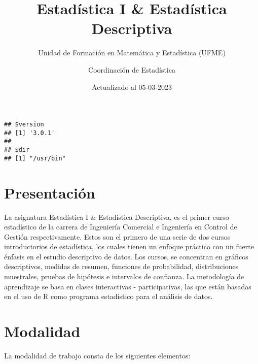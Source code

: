 \documentclass[
]{book}
\title{Estadística I \& Estadística Descriptiva}
\subtitle{Unidad de Formación en Matemática y Estadística (UFME)}
\author{Coordinación de Estadística}
\date{Actualizado al 05-03-2023}
\theoremstyle{definition}
\theoremstyle{definition}
\theoremstyle{definition}
\theoremstyle{definition}
\theoremstyle{remark}
\begin{document}
\maketitle

{
\setcounter{tocdepth}{1}
\tableofcontents
}
\begin{verbatim}
## $version
## [1] '3.0.1'
## 
## $dir
## [1] "/usr/bin"
\end{verbatim}

\hypertarget{presentaciuxf3n}{%
\chapter*{Presentación}\label{presentaciuxf3n}}

La asignatura Estadística I \& Estadística Descriptiva, es el primer curso estadístico de la carrera de Ingeniería Comercial e Ingeniería en Control de Gestión respectivamente. Estos son el primero de una serie de dos cursos introductorios de estadística, los cuales tienen un enfoque práctico con un fuerte énfasis en el estudio descriptivo de datos. Los cursos, se concentran en gráficos descriptivos, medidas de resumen, funciones de probabilidad, distribuciones muestrales, pruebas de hipótesis e intervalos de confianza. La metodología de aprendizaje se basa en clases interactivas - participativas, las que están basadas en el uso de R como programa estadístico para el análisis de datos.

\hypertarget{modalidad}{%
\chapter*{Modalidad}\label{modalidad}}

La modalidad de trabajo consta de los siguientes elementos:
\end{document}
